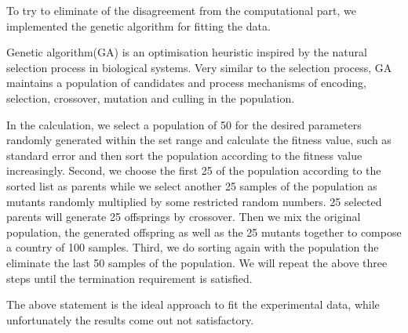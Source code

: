 To try to eliminate of the disagreement from the computational part, we implemented the genetic algorithm for fitting the data\citep{GA}.

Genetic algorithm(GA) is an optimisation heuristic inspired by the natural selection process in biological systems. Very similar to the selection process, GA maintains a population of candidates and process mechanisms of encoding, selection, crossover, mutation and culling in the population\citep{GA}. 

In the calculation, we select a population of 50 for the desired parameters randomly generated within the set range and calculate the fitness value, such as standard error and then sort the population according to the fitness value increasingly. Second, we choose the first 25 of the population according to the sorted list as parents while we select another 25 samples of the population as mutants randomly multiplied by some restricted random numbers. 25 selected parents will generate 25 offsprings by crossover. Then we mix the original population, the generated offspring as well as the 25 mutants together to compose a country of 100 samples. Third, we do sorting again with the population the eliminate the last 50 samples of the population. We will repeat the above three steps until the termination requirement is satisfied. 

The above statement is the ideal approach to fit the experimental data, while unfortunately the results come out not satisfactory.










































